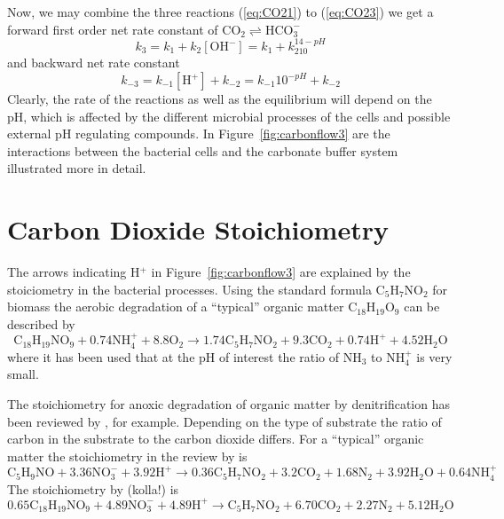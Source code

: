 Now, we may combine the three reactions (\ref{eq:CO21}) to (\ref{eq:CO23}) we get a forward first order net rate constant of $\mbox{CO}_2\rightleftharpoons\mbox{HCO}_3^-$
$$
k_3=k_1+k_2[\mbox{OH}^-]=k_1+k_210^{14-pH}
$$
and backward net rate constant
$$
k_{-3}=k_{-1}[\mbox{H}^+]+k_{-2}=k_{-1}10^{-pH}+k_{-2}
$$
Clearly, the rate of the reactions as well as the equilibrium will depend on the pH, which is affected by the different microbial processes of the cells and possible external pH regulating compounds. In Figure~\ref{fig:carbonflow3} are the interactions between the bacterial cells and the carbonate buffer system illustrated more in detail.


\section{Carbon Dioxide Stoichiometry}
The arrows indicating H$^+$ in Figure~\ref{fig:carbonflow3} are explained by the stoiciometry in the bacterial processes. Using the standard formula C$_5$H$_7$NO$_2$ for biomass the aerobic degradation of a ``typical'' organic matter C$_{18}$H$_{19}$O$_9$ can be described by \cite{HHJ:SBK:90}
\begin{equation}\label{eq:hetaerob}
\mbox{C}_{18}\mbox{H}_{19}\mbox{N}\mbox{O}_9 + 0.74\mbox{NH}_4^+ +8.8\mbox{O}_2 \rightarrow 1.74\mbox{C}_{5}\mbox{H}_{7}\mbox{N}\mbox{O}_2 + 9.3\mbox{CO}_2+0.74\mbox{H}^+ + 4.52\mbox{H}_2\mbox{O}
\end{equation}
where it has been used that at the pH of interest the ratio of NH$_3$ to NH$_4^+$ is very small.

The stoichiometry for anoxic degradation of organic matter by denitrification has been reviewed by , for example. Depending on the type of substrate the ratio of carbon in the substrate to the carbon dioxide differs. For a ``typical'' organic matter the stoichiometry in the review by  is
\begin{equation}\label{eq:hetanaerob}
\mbox{C}_{5}\mbox{H}_{9}\mbox{N}\mbox{O}+3.36\mbox{NO}_3^-+ 3.92\mbox{H}^+ \rightarrow 0.36\mbox{C}_{5}\mbox{H}_{7}\mbox{N}\mbox{O}_2 + 3.2\mbox{CO}_2+1.68\mbox{N}_2 + 3.92\mbox{H}_2\mbox{O}+0.64\mbox{NH}_4^+
\end{equation}
The stoichiometry by  (kolla!) is
\begin{equation}
0.65\mbox{C}_{18}\mbox{H}_{19}\mbox{N}\mbox{O}_9+4.89\mbox{NO}_3^-+ 4.89\mbox{H}^+ \rightarrow \mbox{C}_{5}\mbox{H}_{7}\mbox{N}\mbox{O}_2 + 6.70\mbox{CO}_2+2.27\mbox{N}_2 + 5.12\mbox{H}_2\mbox{O}
\end{equation}

